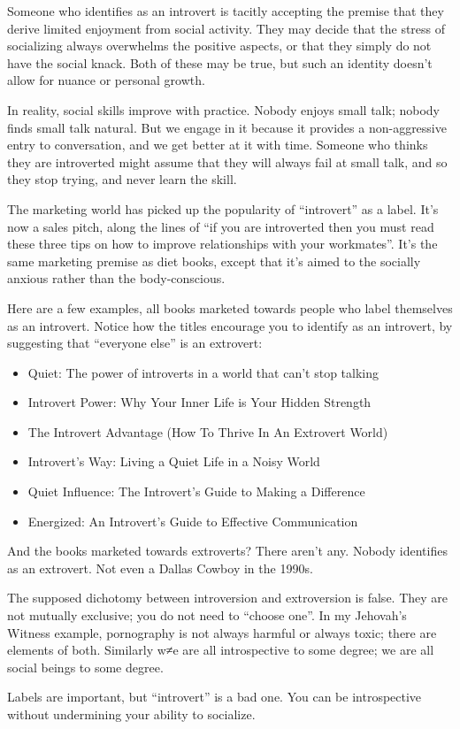 Someone who identifies as an introvert is tacitly accepting the premise that they derive limited enjoyment from social activity. They may decide that the stress of socializing always overwhelms the positive aspects, or that they simply do not have the social knack. Both of these may be true, but such an identity doesn't allow for nuance or personal growth.

In reality, social skills improve with practice. Nobody enjoys small talk; nobody finds small talk natural. But we engage in it because it provides a non-aggressive entry to conversation, and we get better at it with time. Someone who thinks they are introverted might assume that they will always fail at small talk, and so they stop trying, and never learn the skill.

The marketing world has picked up the popularity of ``introvert'' as a label. It's now a sales pitch, along the lines of ``if you are introverted then you must read these three tips on how to improve relationships with your workmates''. It's the same marketing premise as diet books, except that it's aimed to the socially anxious rather than the body-conscious.

Here are a few examples, all books marketed towards people who label themselves as an introvert. Notice how the titles encourage you to identify as an introvert, by suggesting that ``everyone else'' is an extrovert:

\begin{itemize}
  \item Quiet: The power of introverts in a world that can't stop talking
  \item Introvert Power: Why Your Inner Life is Your Hidden Strength
  \item The Introvert Advantage (How To Thrive In An Extrovert World)
  \item Introvert's Way: Living a Quiet Life in a Noisy World
  \item Quiet Influence: The Introvert's Guide to Making a Difference
  \item Energized: An Introvert's Guide to Effective Communication
\end{itemize}

And the books marketed towards extroverts? There aren't any. Nobody identifies as an extrovert. Not even a Dallas Cowboy in the 1990s.

The supposed dichotomy between introversion and extroversion is false. They are not mutually exclusive; you do not need to ``choose one''. In my Jehovah's Witness example, pornography is not always harmful or always toxic; there are elements of both. Similarly w≠e are all introspective to some degree; we are all social beings to some degree.

Labels are important, but ``introvert'' is a bad one. You can be introspective without undermining your ability to socialize.
